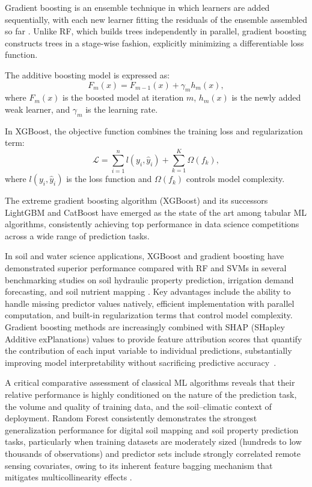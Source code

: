 \documentclass[land,review,accept,pdftex,oneauthor]{Definitions/mdpi}
\begin{document}
Gradient boosting is an ensemble technique in which learners are added sequentially, with each new learner fitting the residuals of the ensemble assembled so far \citep{Friedman2001,Tyralis2019}. Unlike RF, which builds trees independently in parallel, gradient boosting constructs trees in a stage-wise fashion, explicitly minimizing a differentiable loss function.

The additive boosting model is expressed as:
\begin{equation}
F_m(x)=F_{m-1}(x)+\gamma_m h_m(x),
\end{equation}
where $F_m(x)$ is the boosted model at iteration $m$, $h_m(x)$ is the newly added weak learner, and $\gamma_m$ is the learning rate.

In XGBoost, the objective function combines the training loss and regularization term:
\begin{equation}
\mathcal{L}=
\sum_{i=1}^{n}
l(y_i,\hat{y}_i)
+
\sum_{k=1}^{K}\Omega(f_k),
\end{equation}
where $l(y_i,\hat{y}_i)$ is the loss function and $\Omega(f_k)$ controls model complexity.

The extreme gradient boosting algorithm (XGBoost) \citep{Chen2016,Probst2019} and its successors LightGBM and CatBoost have emerged as the state of the art among tabular ML algorithms, consistently achieving top performance in data science competitions across a wide range of prediction tasks.

In soil and water science applications, XGBoost and gradient boosting have demonstrated superior performance compared with RF and SVMs in several benchmarking studies on soil hydraulic property prediction, irrigation demand forecasting, and soil nutrient mapping {\citep{Hengl2017,zhang2018deep,Lemenkova202518}}. Key advantages include the ability to handle missing predictor values natively, efficient implementation with parallel computation, and built-in regularization terms that control model complexity. Gradient boosting methods are increasingly combined with SHAP (SHapley Additive exPlanations) values \citep{lundberg2017unified} to provide feature attribution scores that quantify the contribution of each input variable to individual predictions, substantially improving model interpretability without sacrificing predictive accuracy~\citep{Lemenkova202518,Lemenkova202505}.

{A critical comparative assessment of classical ML algorithms reveals that their relative performance is highly conditioned on the nature of the prediction task, the volume and quality of training data, and the soil--climatic context of deployment. Random Forest consistently demonstrates the strongest generalization performance for digital soil mapping and soil property prediction tasks, particularly when training datasets are moderately sized (hundreds to low thousands of observations) and predictor sets include strongly correlated remote sensing covariates, owing to its inherent feature bagging mechanism that mitigates multicollinearity effects} \citep{Hengl2017}. 
\end{document}
